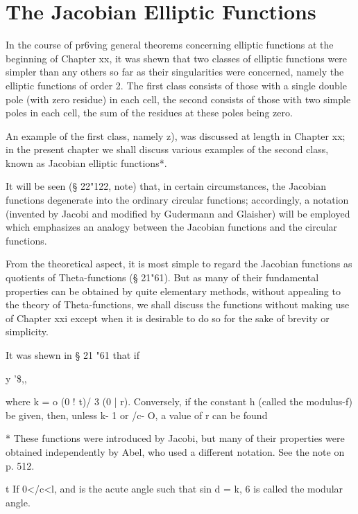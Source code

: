 \chapter{The Jacobian Elliptic Functions} 


In the course of pr6ving general theorems concerning elliptic
functions at the beginning of Chapter xx, it was shewn that two
classes of elliptic functions were simpler than any others so far as
their singularities were concerned, namely the elliptic functions of
order 2. The first class consists of those with a single double pole
(with zero residue) in each cell, the second consists of those with
two simple poles in each cell, the sum of the residues at these poles
being zero.

An example of the first class, namely z), was discussed at length in
Chapter xx; in the present chapter we shall discuss various examples
of the second class, known as Jacobian elliptic functions*.

It will be seen (§ 22"122, note) that, in certain circumstances, the
Jacobian functions degenerate into the ordinary circular functions;
accordingly, a notation (invented by Jacobi and modified by Gudermann
and Glaisher) will be employed which emphasizes an analogy between the
Jacobian functions and the circular functions.

From the theoretical aspect, it is most simple to regard the Jacobian
functions as quotients of Theta-functions (§ 21"61). But as many of
their fundamental properties can be obtained by quite elementary
methods, without appealing to the theory of Theta-functions, we shall
discuss the functions without making use of Chapter xxi except when it
is desirable to do so for the sake of brevity or simplicity.

It was shewn in
§ 21 "61 that if

y '\$,,%

where k = o (0 ! t)/ 3 (0 | r). Conversely, if the constant h (called
the modulus-f) be given, then, unless k- 1 or /c- O, a value of r can
be found

* These functions were introduced by Jacobi, but many of their
properties were obtained independently by Abel, who used a different
notation. See the note on p. 512.

t If 0</c<l, and is the acute angle such that sin d = k, 6 is called
the modular angle.

